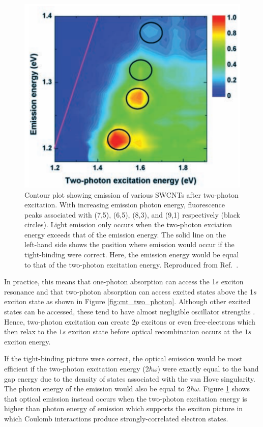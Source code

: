 \begin{figure}[ht]
	\centering
	\includegraphics[scale=0.3]{images/chapter_optical_props/two_photon_wang}
	\caption{Contour plot showing emission of various SWCNTs after two-photon excitation. With increasing emission photon energy, fluorescence peaks associated with (7,5), (6,5), (8,3), and (9,1) respectively (black circles). Light emission only occurs when the two-photon exciation energy exceeds that of the emission energy. The solid line on the left-hand side shows the position where emission would occur if the tight-binding were correct. Here, the emission energy would be equal to that of the two-photon excitation energy. Reproduced from Ref.\ \cite{wang2005optical}.}
	\label{fig:cnt_two_photon_emission}
\end{figure}

In practice, this means that one-photon absorption can access the 1$s$ exciton resonance and that two-photon absorption can access excited states above the 1$s$ exciton state as shown in Figure \ref{fig:cnt_two_photon}. Although other excited states can be accessed, these tend to have almost negligible oscillator strengths \cite{wang2005optical}. Hence, two-photon excitation can create $2p$ excitons or even free-electrons which then relax to the $1s$ exciton state before optical recombination occurs at the $1s$ exciton energy.

If the tight-binding picture were correct, the optical emission would be most efficient if the two-photon excitation energy (2$\hbar \omega$) were exactly equal to the band gap energy due to the density of states associated with the van Hove singularity. The photon energy of the emission would also be equal to 2$\hbar \omega$. Figure \ref{fig:cnt_two_photon_emission} shows that optical emission instead occurs when the two-photon excitation energy is higher than photon energy of emission which supports the exciton picture in which Coulomb interactions produce strongly-correlated electron states.




